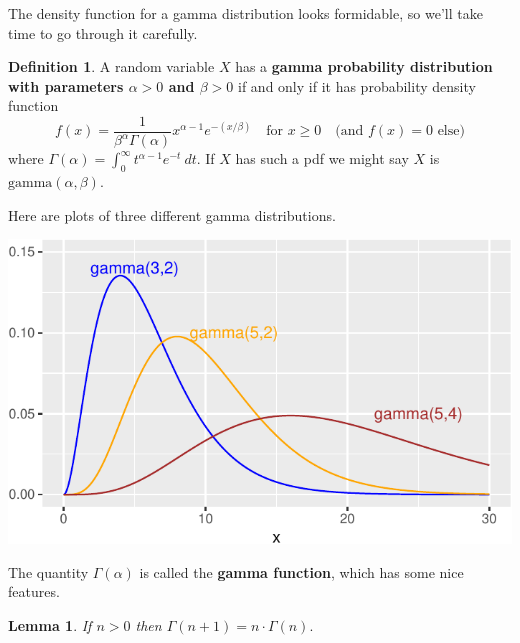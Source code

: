 \documentclass[
]{book}
\newtheorem{lemma}{Lemma}[chapter]
\theoremstyle{definition}
\newtheorem{definition}{Definition}[chapter]
\theoremstyle{definition}
\theoremstyle{definition}
\theoremstyle{definition}
\theoremstyle{remark}
\begin{document}
The density function for a gamma distribution looks formidable, so we'll take time to go through it carefully.

\begin{definition}
\protect\hypertarget{def:gamma-distribution}{}\label{def:gamma-distribution}A random variable \(X\) has a \textbf{gamma probability distribution with parameters \(\alpha>0\) and \(\beta>0\)} if and only if it has probability density function
\[
f(x)=
\frac{1}{\beta^\alpha \Gamma(\alpha)}x^{\alpha-1}e^{-(x/\beta)}~~~ \text{ for }x \geq 0~~~ \text{ (and }f(x) = 0\text{ else)}
\]
where \(\displaystyle\Gamma(\alpha) = \int_0^\infty t^{\alpha-1}e^{-t}~dt\).
If \(X\) has such a pdf we might say \(X\) is \(\text{gamma}(\alpha,\beta)\).
\end{definition}

Here are plots of three different gamma distributions.

\begin{center}\includegraphics{math340-notes_files/figure-latex/unnamed-chunk-22-1} \end{center}

The quantity \(\Gamma(\alpha)\) is called the \textbf{gamma function}, which has some nice features.

\begin{lemma}
\protect\hypertarget{lem:gamma-fcn-ind-step}{}\label{lem:gamma-fcn-ind-step}If \(n > 0\) then \(\Gamma(n+1) = n \cdot \Gamma(n).\)
\end{lemma}
\end{document}
